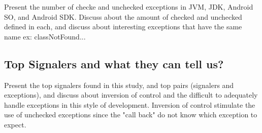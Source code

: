 \documentclass[conference]{IEEEtran}
\begin{document}
Present the number of checke and unchecked exceptions in JVM, JDK, Android SO, and Android SDK.
Discuss about the amount of checked and unchecked defined in each, and discuss about interesting exceptions that
have the same name ex: classNotFound...

\subsection{Top Signalers and what they can tell us?}

Present the top signalers found in this study, and top pairs (signalers and exceptions), and discuss 
about inversion of control and the difficult to adequately handle exceptions in this style of development.
Inversion of control stimulate the use of unchecked exceptions since the "call back" do not know which exception to expect.
\end{document}
